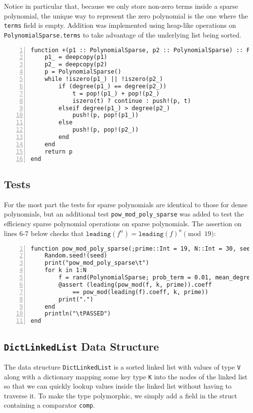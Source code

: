 \documentclass{article}
\theoremstyle{plain}
\numberwithin{theorem}{section}
\numberwithin{example}{section}
\theoremstyle{definition}
\numberwithin{definition}{section}
\begin{document}
Notice in particular that, because we only store non-zero terms inside a sparse
polynomial, the unique way to represent the zero polynomial is the one where the
\texttt{terms} field is empty. Addition was implemented using heap-like
operations on \texttt{PolynomialSparse.terms} to take advantage of the
underlying list being sorted.

\begin{codebox}
    \begin{Verbatim}[numbers=left,xleftmargin=5mm]
function +(p1 :: PolynomialSparse, p2 :: PolynomialSparse) :: PolynomialSparse
    p1_ = deepcopy(p1)
    p2_ = deepcopy(p2)
    p = PolynomialSparse()
    while !iszero(p1_) || !iszero(p2_)
        if (degree(p1_) == degree(p2_))
            t = pop!(p1_) + pop!(p2_)
            iszero(t) ? continue : push!(p, t)
        elseif degree(p1_) > degree(p2_)
            push!(p, pop!(p1_))
        else
            push!(p, pop!(p2_))
        end
    end
    return p
end
    \end{Verbatim}
\end{codebox}

\bigbreak

\subsection{Tests}
For the most part the tests for sparse polynomials are identical to those for
dense polynomials, but an additional test \texttt{pow\_mod\_poly\_sparse} was
added to test the efficiency sparse polynomial operations on sparse polynomials.
The assertion on lines 6-7 below checks that $\texttt{leading}(f^n) =
\texttt{leading}(f)^n \pmod{19}$:

\begin{codebox}
    \begin{Verbatim}[numbers=left,xleftmargin=5mm]
function pow_mod_poly_sparse(;prime::Int = 19, N::Int = 30, seed::Int = 0)
    Random.seed!(seed)
    print("pow_mod_poly_sparse\t")
    for k in 1:N
        f = rand(PolynomialSparse; prob_term = 0.01, mean_degree = Float64(120))
        @assert (leading(pow_mod(f, k, prime)).coeff
            == pow_mod(leading(f).coeff, k, prime))
        print(".")
    end
    println("\tPASSED")
end
    \end{Verbatim}
\end{codebox}

\bigbreak

\subsection{\texttt{DictLinkedList} Data Structure} \label{dll}
The data structure \texttt{DictLinkedList} is a sorted
linked list with values of type \texttt V along with a dictionary mapping some
key type \texttt K into the nodes of the linked list so that we can quickly
lookup values inside the linked list without having to traverse it. To make
the type polymorphic, we simply add a field in the struct containing a
comparator \texttt{comp}.
\end{document}
